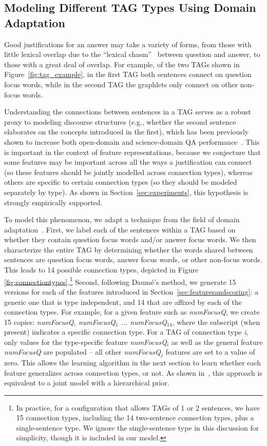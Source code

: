 \subsection {Modeling Different TAG Types Using Domain Adaptation} %
\label{sec:characterizing}

Good justifications for an answer may take a variety of forms, from those with little lexical overlap due to the ``lexical chasm''~\cite{Berger:00} between question and answer, to those with a great deal of overlap. For example, of the two TAGs shown in Figure~\ref{fig:tag_example}, in the first TAG both sentences connect on question focus words, while in the second TAG the graphlets only connect on other non-focus words. 

Understanding the connections between sentences in a TAG serves as a robust proxy to modeling discourse structures (e.g., whether the second sentence elaborates on the concepts introduced in the first), which has been previously shown to increase both open-domain and science-domain QA performance~\cite{jansen14}.
This is important in the context of feature representations, because we conjecture that some features may be important across all the ways a justification can connect (so these features should be jointly modelled across connection types), whereas others are specific to certain connection types (so they should be modeled separately by type). As shown in Section~\ref{sec:experiments}, this hypothesis is strongly empirically supported.

To model this phenomenon, we adapt a technique from the field of domain adaptation~\cite{daume2007}.
First, we label each of the sentences within a TAG based on whether they contain question focus words and/or answer focus words.  We then characterize the entire TAG by determining whether the words shared between sentences are question focus words, answer focus words, or other non-focus words.  This leads to 14 possible connection types, depicted in Figure \ref{fig:connectiontypes}.\footnote{In practice, for a configuration that allows TAGs of 1 or 2 sentences, we have 15 connection types, including the 14 two-sentence connection types, plus a single-sentence type. We ignore the single-sentence type in this discussion for simplicity, though it is included in our model.}
Second, following Daum{\'e}'s method, we generate 15 versions for each of the features introduced in Section~\ref{sec:featuresandscoring}: a generic one that is type independent, and 14 that are affixed by each of the connection types. For example, for a given feature such as \emph{numFocusQ}, we create 15 copies: \emph{numFocusQ, numFocusQ$_1$ ... numFocusQ$_{14}$}, where the subscript (when present) indicates a specific connection type. For a TAG of connection type \emph{i}, only values for the type-specific feature \emph{numFocusQ$_i$} as well as the general feature \emph{numFocusQ} are populated -- all other \emph{numFocusQ$_j$} features are set to a value of zero. This allows the learning algorithm in the next section to learn whether each feature generalizes across connection types, or not. As shown in~\cite{finkel2010hierarchical}, this approach is equivalent to a joint model with a hierarchical prior. 



